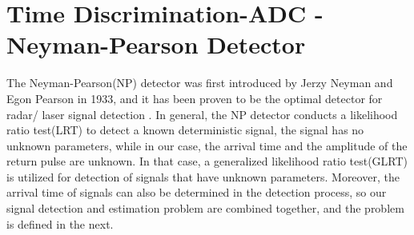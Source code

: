 \chapter{Time Discrimination-ADC -  Neyman-Pearson Detector}\label{ch:NP}
The Neyman-Pearson(NP) detector was first introduced by Jerzy Neyman and Egon Pearson in 1933\citep{neyman1933problem}, and it has been proven to be the optimal detector for radar/ laser signal detection \cite{kay1998fundamentals}.  
In general, the NP detector conducts a likelihood ratio test(LRT) to detect a known deterministic signal, \ie the signal has no unknown parameters, while in our case, the arrival time and the amplitude of the return pulse are unknown. In that case, a generalized likelihood ratio test(GLRT) is utilized for detection of signals that have unknown parameters. Moreover, the arrival time of signals can also be determined in the detection process, so our signal detection and estimation problem are combined together, and the problem is defined in the next.
